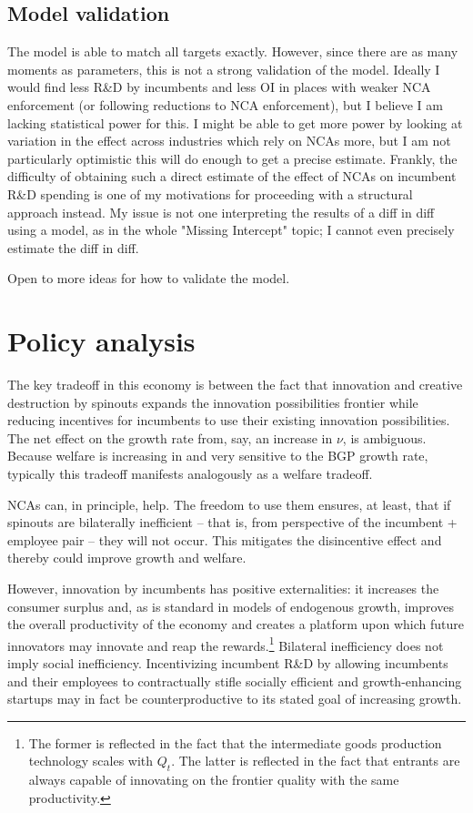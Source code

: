 \documentclass[11pt,english]{article}
\theoremstyle{remark}
\begin{document}
\subsection{Model validation} The model is able to match all targets exactly. However, since there are as many moments as parameters, this is not a strong validation of the model. Ideally I would find less R\&D by incumbents and less OI in places with weaker NCA enforcement (or following reductions to NCA enforcement), but I believe I am lacking statistical power for this. I might be able to get more power by looking at variation in the effect across industries which rely on NCAs more, but I am not particularly optimistic this will do enough to get a precise estimate. Frankly, the difficulty of obtaining such a direct estimate of the effect of NCAs on incumbent R\&D spending is one of my motivations for proceeding with a structural approach instead. My issue is not one interpreting the results of a diff in diff using a model, as in the whole "Missing Intercept" topic; I cannot even precisely estimate the diff in diff. 

Open to more ideas for how to validate the model.




\section{Policy analysis}

The key tradeoff in this economy is between the fact that innovation and creative destruction by spinouts expands the innovation possibilities frontier while reducing incentives for incumbents to use their existing innovation possibilities. The net effect on the growth rate from, say, an increase in $\nu$, is ambiguous. Because welfare is increasing in and very sensitive to the BGP growth rate, typically this tradeoff manifests analogously as a welfare tradeoff.

NCAs can, in principle, help. The freedom to use them ensures, at least, that if spinouts are bilaterally inefficient -- that is, from perspective of the incumbent + employee pair -- they will not occur. This mitigates the disincentive effect and thereby could improve growth and welfare. 

However, innovation by incumbents has positive externalities: it increases the consumer surplus and, as is standard in models of endogenous growth, improves the overall productivity of the economy and creates a platform upon which future innovators may innovate and reap the rewards.\footnote{The former is reflected in the fact that the intermediate goods production technology scales with $Q_t$. The latter is reflected in the fact that entrants are always capable of innovating on the frontier quality with the same productivity.} Bilateral inefficiency does not imply social inefficiency. Incentivizing incumbent R\&D by allowing incumbents and their employees to contractually stifle socially efficient and growth-enhancing startups may in fact be counterproductive to its stated goal of increasing growth.
\end{document}
